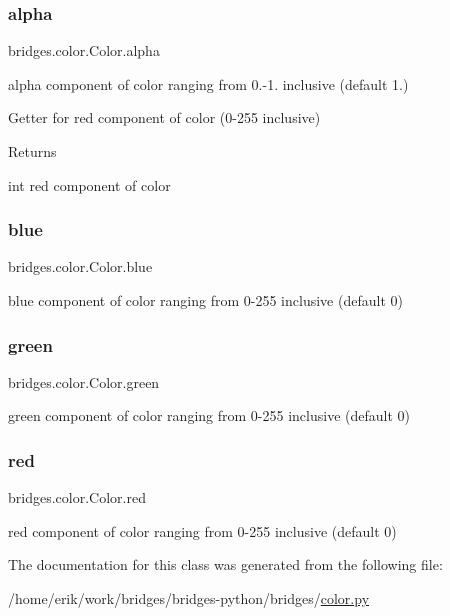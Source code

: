 \subsubsection{\texorpdfstring{alpha}{alpha}}
{\footnotesize\ttfamily bridges.\+color.\+Color.\+alpha}



alpha component of color ranging from 0.-\/1. inclusive (default 1.) 

Getter for red component of color (0-\/255 inclusive) \begin{DoxyReturn}{Returns}


int red component of color 
\end{DoxyReturn}
\mbox{\label{classbridges_1_1color_1_1_color_a2c5081c47a43419bb1c5dbbd9c72a21e}} 
\subsubsection{\texorpdfstring{blue}{blue}}
{\footnotesize\ttfamily bridges.\+color.\+Color.\+blue}



blue component of color ranging from 0-\/255 inclusive (default 0) 

\mbox{\label{classbridges_1_1color_1_1_color_a6f14b2d3ec82052c1aeb259ee687059d}} 
\subsubsection{\texorpdfstring{green}{green}}
{\footnotesize\ttfamily bridges.\+color.\+Color.\+green}



green component of color ranging from 0-\/255 inclusive (default 0) 

\mbox{\label{classbridges_1_1color_1_1_color_abb0aa417808af0140d3448a2e49d2d15}} 
\subsubsection{\texorpdfstring{red}{red}}
{\footnotesize\ttfamily bridges.\+color.\+Color.\+red}



red component of color ranging from 0-\/255 inclusive (default 0) 



The documentation for this class was generated from the following file\+:\begin{DoxyCompactItemize}
\item 
/home/erik/work/bridges/bridges-\/python/bridges/\hyperlink{color_8py}{color.\+py}\end{DoxyCompactItemize}
